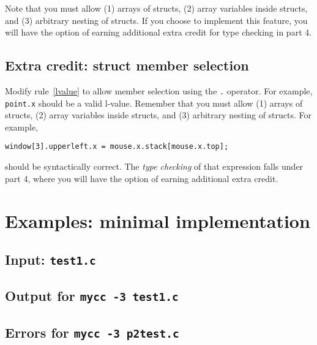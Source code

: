 \documentclass{article}
\newcommand{\thispart}{3}
\newcommand{\typecheck}{4}
\begin{document}
Note that you must allow (1) arrays of structs, (2) array variables
inside structs, and (3) arbitrary nesting of structs.
%
If you choose to implement this feature,
you will have the option of earning
additional extra credit for type checking
in part \typecheck.

\subsection{Extra credit: struct member selection}
\label{SEC:lastextra}
\label{SEC:members}

Modify rule~\ref{lvalue} to allow member selection using the
{\tt .} operator.
For example,
\lstinline{point.x}
should be a valid l-value.
Remember that you must allow (1) arrays of structs,
(2) array variables inside structs, and (3) arbitrary nesting of structs.
For example,
\begin{lstlisting}[numbers=none]
  window[3].upperleft.x = mouse.x.stack[mouse.x.top];
\end{lstlisting}
should be syntactically correct.
The \emph{type checking} of that expression falls under part \typecheck,
where you will have the option of earning additional extra credit.



\section{Examples: minimal implementation} \label{SEC:exmin}

\subsection{Input: {\tt test1.c}}



\subsection{Output for {\tt mycc -\thispart{} test1.c}}



\subsection{Errors for {\tt mycc -\thispart{} p2test.c}}
\end{document}

